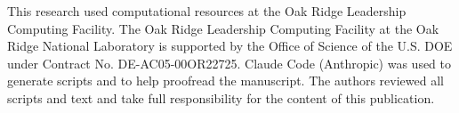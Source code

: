 This research used computational resources at the Oak Ridge Leadership Computing Facility.
The Oak Ridge Leadership Computing Facility at the Oak Ridge National Laboratory is supported
by the Office of Science of the U.S. DOE under Contract No. DE-AC05-00OR22725.
Claude Code (Anthropic) was used to generate scripts and to help proofread the manuscript.
The authors reviewed all scripts and text and take full responsibility for the content of
this publication.
